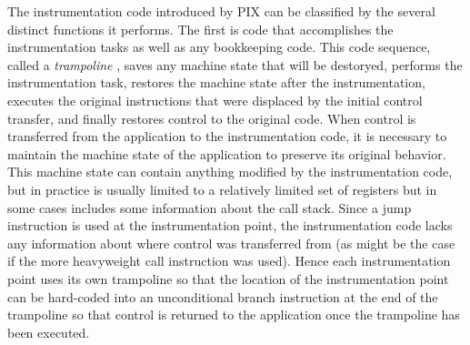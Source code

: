 The instrumentation code introduced by PIX can be classified by the several distinct functions it
performs. The first
is code that accomplishes the instrumentation tasks as well as any bookkeeping code.
This code sequence, called a \textit{trampoline} \cite{buck2000api}, 
saves any machine state that will be destoryed, performs the instrumentation task, restores
the machine state after the instrumentation, executes the
original instructions that were displaced by the initial control transfer,
and finally restores control to the original code. 
When control is transferred from the application to the
instrumentation code, it is necessary to maintain the machine state of
the application to preserve its original behavior. This machine state
can contain anything modified by the instrumentation code, but in practice is
usually limited to a relatively limited set of registers but in some cases includes
some information about the call stack. 
Since a jump instruction is used at the instrumentation point, the
instrumentation code lacks any information about where control was transferred from
(as might be the case if the more heavyweight call instruction was used). Hence
each instrumentation point uses its own trampoline so that the location of the
instrumentation point can be hard-coded into an unconditional branch instruction
at the end of the trampoline so that control is returned to the application
once the trampoline has been executed.

